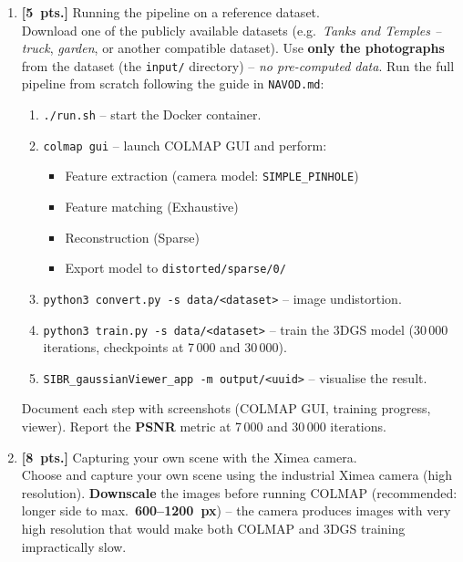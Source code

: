 \documentclass{article}
\begin{document}
\begin{enumerate}

\item \textbf{[5~pts.]} Running the pipeline on a reference dataset.\\
Download one of the publicly available datasets (e.g.\ \textit{Tanks and
Temples -- truck}, \textit{garden}, or another compatible dataset).
Use \textbf{only the photographs} from the dataset (the \texttt{input/} directory) --
\emph{no pre-computed data}.
Run the full pipeline from scratch following the guide in \texttt{NAVOD.md}:

\begin{enumerate}
    \item \texttt{./run.sh} -- start the Docker container.
    \item \texttt{colmap gui} -- launch COLMAP GUI and perform:
        \begin{itemize}
            \item Feature extraction (camera model: \texttt{SIMPLE\_PINHOLE})
            \item Feature matching (Exhaustive)
            \item Reconstruction (Sparse)
            \item Export model to \texttt{distorted/sparse/0/}
        \end{itemize}
    \item \texttt{python3 convert.py -s data/<dataset>} -- image undistortion.
    \item \texttt{python3 train.py -s data/<dataset>} -- train the 3DGS model
          (30\,000 iterations, checkpoints at 7\,000 and 30\,000).
    \item \texttt{SIBR\_gaussianViewer\_app -m output/<uuid>} -- visualise the result.
\end{enumerate}

Document each step with screenshots (COLMAP GUI, training progress, viewer).
Report the \textbf{PSNR} metric at 7\,000 and 30\,000 iterations.

\item \textbf{[8~pts.]} Capturing your own scene with the Ximea camera.\\
Choose and capture your own scene using the industrial Ximea camera (high resolution).
\textbf{Downscale} the images before running COLMAP
(recommended: longer side to max.\ \textbf{600--1200~px}) -- the camera produces
images with very high resolution that would make both COLMAP and 3DGS training
impractically slow.


\end{enumerate}
\end{document}
